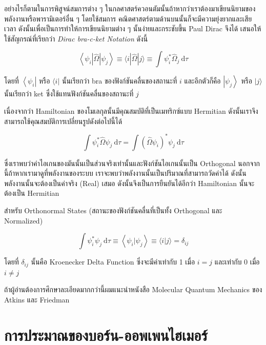 อย่างไรก็ตามในการพิสูจน์สมการต่าง ๆ ในกลศาสตร์ควอนตัมนั้นถ้าหากว่าเราต้องมาเขียนนิยามของพลังงานหรือพารามิเตอร์อื่น ๆ โดยใช้สมการ%
คณิตศาสตร์ตามด้านบนนั้นก็จะมีความยุ่งยากและเสียเวลา ดังนั้นเพื่อเป็นการทำให้การเขียนนิยามต่าง ๆ นั้นง่ายและกระชับขึ้น Paul Dirac จึงได้%
เสนอให้ใช้สัญกรณ์ที่เรียกว่า \textit{Dirac bra-c-ket Notation} ดังนี้

\begin{equation}
  \left\langle\psi_i|\hat{\Omega}| \psi_j\right\rangle
  \equiv
  \langle i|\hat{\Omega}| j\rangle
  \equiv
  \int \psi_i^* \hat{\Omega}_j \mathrm{~d} \tau
\end{equation}

\noindent โดยที่ $\left\langle\psi_i\right|$ หรือ $\langle i|$ นั้นเรียกว่า bra ของฟังก์ชันคลื่นของสถานะที่ $i$ และอีกตัวก็คือ
$\left|\psi_j\right\rangle$ หรือ $|j\rangle$ นั้นเรียกว่า ket ซึ่งใช้แทนฟังก์ชันคลื่นของสถานะที่ $j$

เนื่องจากว่า Hamiltonian ของโมเลกุลนั้นมีคุณสมบัติที่เป็นเมทริกซ์แบบ Hermitian ดังนั้นเราจึงสามารถใช้คุณสมบัติการเปลี่ยนรูปดังต่อไปนี้ได้

\begin{equation}
  \int \psi_i^* \hat{\Omega} \psi_j \mathrm{~d} \tau
  =
  \int\left(\hat{\Omega} \psi_i\right)^* \psi_j \mathrm{~d} \tau
\end{equation}

\noindent ซึ่งเราพบว่าค่าไอเกนของมันนั้นเป็นส่วนจริงเท่านั้นและฟังก์ชันไอเกนนั้นเป็น Orthogonal นอกจากนี้ถ้าหากเรามาดูที่พลังงานของระบบ%
เราจะพบว่าพลังงานนั้นเป็นปริมาณที่สามารถวัดค่าได้ ดังนั้นพลังงานนั้นจะต้องเป็นค่าจริง (Real) เสมอ ดังนั้นจึงเป็นการยืนยันได้อีกว่า Hamiltonian
นั้นจะต้องเป็น Hermitian

สำหรับ Orthonormal States (สถานะของฟังก์ชันคลื่นที่เป็นทั้ง Orthogonal และ Normalized)

\begin{equation}
  \int \psi_i^* \psi_j \mathrm{~d} \tau
  \equiv
  \left\langle\psi_i | \psi_j\right\rangle
  \equiv
  \langle i | j\rangle=\delta_{i j}
\end{equation}

\noindent โดยที่ $\delta_{i j}$ นั้นคือ Kroenecker Delta Function ซึ่งจะมีค่าเท่ากับ 1 เมื่อ $i=j$ และเท่ากับ 0 เมื่อ $i \neq j$

ถ้าผู้อ่านต้องการศึกษาละเอียดมากกว่านี้ผมแนะนำหนังสือ Molecular Quantum Mechanics ของ Atkins และ Friedman

\section{การประมาณของบอร์น-ออพเพนไฮเมอร์}

